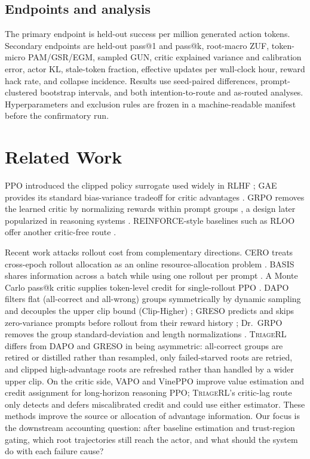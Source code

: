 \documentclass{article}
\newcommand{\method}{\textsc{TriageRL}\xspace}
\begin{document}
\subsection{Endpoints and analysis}

The primary endpoint is held-out success per million generated action tokens.
Secondary endpoints are held-out pass@1 and pass@k, root-macro ZUF, token-micro
PAM/GSR/EGM, sampled GUN, critic explained variance and calibration error,
actor KL, stale-token fraction, effective updates per wall-clock hour, reward
hack rate, and collapse incidence.  Results use seed-paired differences,
prompt-clustered bootstrap intervals, and both intention-to-route and
as-routed analyses.  Hyperparameters and exclusion rules are frozen in a
machine-readable manifest before the confirmatory run.

\section{Related Work}

PPO introduced the clipped policy surrogate used widely in RLHF
\citep{schulman2017ppo,ouyang2022training}; GAE provides its standard
bias-variance tradeoff for critic advantages \citep{schulman2016gae}.
GRPO removes the learned critic by normalizing rewards within prompt groups
\citep{shao2024deepseekmath}, a design later popularized in reasoning systems
\citep{deepseekai2025r1}.  REINFORCE-style baselines such as RLOO offer another
critic-free route \citep{ahmadian2024back}.

Recent work attacks rollout cost from complementary directions.  CERO treats
cross-epoch rollout allocation as an online resource-allocation problem
\citep{zong2026cero}.  BASIS shares information across a batch while using one
rollout per prompt \citep{gong2026basis}.  A Monte Carlo pass@k critic supplies
token-level credit for single-rollout PPO \citep{che2026single}.  DAPO filters flat (all-correct and all-wrong)
groups symmetrically by dynamic sampling and decouples the upper clip bound
(Clip-Higher) \citep{yu2025dapo}; GRESO predicts and skips zero-variance prompts
before rollout from their reward history \citep{zheng2025greso}; Dr.~GRPO removes
the group standard-deviation and length normalizations \citep{liu2025drgrpo}.
\method differs from DAPO and GRESO in being asymmetric: all-correct groups are
retired or distilled rather than resampled, only failed-starved roots are
retried, and clipped high-advantage roots are refreshed rather than handled by a
wider upper clip.  On the critic side, VAPO \citep{yue2025vapo} and VinePPO
\citep{kazemnejad2025vineppo} improve value estimation and credit assignment for
long-horizon reasoning PPO; \method's critic-lag route only detects and defers
miscalibrated credit and could use either estimator.  These methods
improve the source or allocation of advantage information.  Our focus is the
downstream accounting question: after baseline estimation and trust-region
gating, which root trajectories still reach the actor, and what should the
system do with each failure cause?
\end{document}
